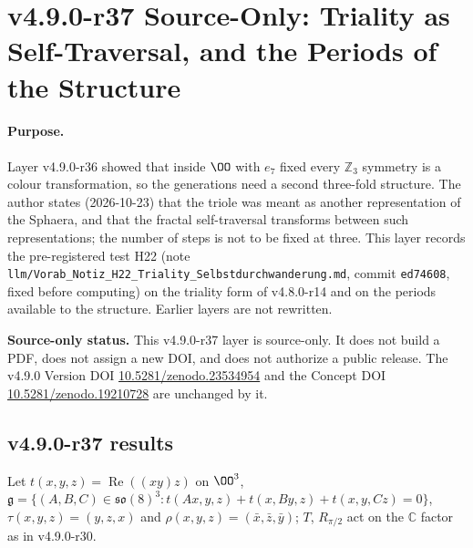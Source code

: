 \clearpage
\section*{v4.9.0-r37 Source-Only: Triality as Self-Traversal, and the Periods of the Structure}
\label{sec:v490-r37-triality-self-traversal}

\paragraph{Purpose.}
Layer v4.9.0-r36 showed that inside \(\OO\) with \(e_7\) fixed every \(\mathbb Z_3\) symmetry is a colour transformation, so the
generations need a second three-fold structure.  The author states (2026-10-23) that the triole was meant as another
representation of the Sphaera, and that the fractal self-traversal transforms between such representations; the number of steps
is not to be fixed at three.  This layer records the pre-registered test H22 (note
\texttt{llm/Vorab\_Notiz\_H22\_Triality\_Selbstdurchwanderung.md}, commit \texttt{ed74608}, fixed before computing) on the triality
form of v4.8.0-r14 and on the periods available to the structure.  Earlier layers are not rewritten.

\noindent\textbf{Source-only status.}
This v4.9.0-r37 layer is source-only.  It does not build a PDF, does not assign a new DOI,
and does not authorize a public release.  The v4.9.0 Version DOI
\href{https://doi.org/10.5281/zenodo.23534954}{10.5281/zenodo.23534954} and the Concept DOI
\href{https://doi.org/10.5281/zenodo.19210728}{10.5281/zenodo.19210728} are unchanged by it.

\subsection*{v4.9.0-r37 results}
\label{subsec:v490-r37-results}

Let \(t(x,y,z)=\operatorname{Re}((xy)z)\) on \(\OO^3\),
\(\mathfrak g=\{(A,B,C)\in\mathfrak{so}(8)^3: t(Ax,y,z)+t(x,By,z)+t(x,y,Cz)=0\}\), \(\tau(x,y,z)=(y,z,x)\) and
\(\rho(x,y,z)=(\bar x,\bar z,\bar y)\); \(T\), \(R_{\pi/2}\) act on the \(\mathbb C\) factor as in v4.9.0-r30.

